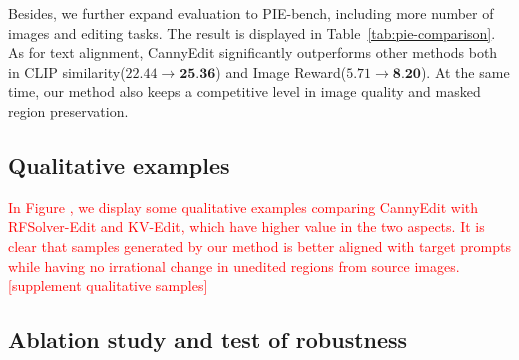 \documentclass{article}
\begin{document}
Besides, we further expand evaluation to PIE-bench, including more number of images and editing tasks. The result is displayed in Table~\ref{tab:pie-comparison}. As for text alignment, CannyEdit significantly outperforms other methods both in CLIP similarity($22.44\rightarrow \textbf{25.36}$) and Image Reward($5.71\rightarrow \textbf{8.20}$). At the same time, our method also keeps a competitive level in image quality and masked region preservation. 

\subsection{Qualitative examples}

\textcolor{red}{In Figure  , we display some qualitative examples comparing CannyEdit with RFSolver-Edit and KV-Edit, which have higher value in the two aspects. It is clear that samples generated by our method is better aligned with target prompts while having no irrational change in unedited regions from source images.[supplement qualitative samples]}

\subsection{Ablation study and test of robustness}
\end{document}
